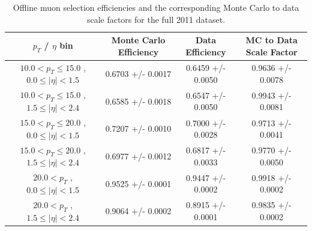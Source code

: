  \begin{table}[!ht]
 \begin{center} 
 \begin{tabular}{|c|c|c|c|}
 \hline
 $p_{T}$ / $\eta$ bin    &  Monte Carlo Efficiency    &  Data Efficiency   &  MC to Data Scale Factor \\   \hline           
$ 10.0 < p_{T} \le  15.0$ , $  0.0  \le |\eta| <   1.5$   &       0.6703 +/- 0.0017   &       0.6459 +/- 0.0050   &       0.9636 +/- 0.0078   \\   
\hline
$ 10.0 < p_{T} \le  15.0$ , $  1.5  \le |\eta| <   2.4$   &       0.6585 +/- 0.0018   &       0.6547 +/- 0.0050   &       0.9943 +/- 0.0081   \\   
\hline
$ 15.0 < p_{T} \le  20.0$ , $  0.0  \le |\eta| <   1.5$   &       0.7207 +/- 0.0010   &       0.7000 +/- 0.0028   &       0.9713 +/- 0.0041   \\   
\hline
$ 15.0 < p_{T} \le  20.0$ , $  1.5  \le |\eta| <   2.4$   &       0.6977 +/- 0.0012   &       0.6817 +/- 0.0033   &       0.9770 +/- 0.0050   \\   
\hline
$ 20.0 < p_{T} $ , $  0.0  \le |\eta| <   1.5$   &       0.9525 +/- 0.0001   &       0.9447 +/- 0.0002   &       0.9918 +/- 0.0002   \\   
\hline
$ 20.0 < p_{T} $ , $  1.5  \le |\eta| <   2.4$   &       0.9064 +/- 0.0002   &       0.8915 +/- 0.0001   &       0.9835 +/- 0.0002   \\   
\hline
\end{tabular}
\caption{Offline muon selection efficiencies and the corresponding Monte Carlo to data scale factors for the
full 2011 dataset.}
\label{tab:eff_mu_offline_Full2011}
\end{center}
\end{table}








